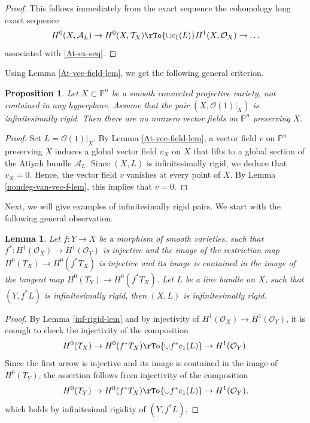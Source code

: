 \documentclass[reqno]{amsart}
\newtheorem{lemma}[theorem]{Lemma}
\newtheorem{prop}[theorem]{Proposition}
\theoremstyle{definition}
\theoremstyle{remark}
\renewcommand{\P}{{\mathbb P}}
\newcommand{\OO}{{\mathcal O}}
\newcommand{\sub}{\subset}
\newcommand{\cA}{\mathcal{A}}
\newcommand{\cT}{\mathcal{T}}
\newcommand{\cO}{\mathcal{O}}
\numberwithin{equation}{section}
\begin{document}
\begin{proof}
This follows immediately from 
the exact sequence the cohomology long exact sequence
$$H^0(X,\cA_L)\to H^0(X,\cT_X)\rTo{\cup c_1(L)} H^1(X,\cO_X)\to\ldots$$
associated with \eqref{At-ex-seq}.
\end{proof}

Using Lemma \ref{At-vec-field-lem}, we get the following general criterion.

\begin{prop}\label{inf-rigid-emb-prop} 
Let $X\sub \P^n$ be a smooth connected projective variety, 
not contained in any hyperplane. 
Assume that the pair $(X,\cO(1)|_X)$ is infinitesimally rigid.
Then there are no nonzero vector fields on $\P^n$ preserving $X$.
\end{prop}

\begin{proof} Set $L=\cO(1)|_X$.
By Lemma \ref{At-vec-field-lem}, a vector field $v$ on $\P^n$ preserving $X$ induces a global vector field $v_X$ on $X$ that lifts to a global section of the Atiyah bundle $\cA_L$.
Since $(X,L)$ is infinitesimally rigid, we deduce that $v_X=0$. Hence, the vector field $v$ vanishes at every point of $X$. By Lemma \ref{nondeg-van-vec-f-lem}, this implies that $v=0$.
\end{proof}

Next, we will give examples of infinitesimally rigid pairs.
We start with the following general observation.

\begin{lemma}\label{inf-rigid-pullback-lem} 
Let $f:Y\to X$ be a morphism of smooth varieties, such that $f^*:H^1(\OO_X)\to H^1(\OO_Y)$ is injective and the image of the restriction map
$H^0(T_X)\to H^0(f^*T_X)$ is injective and its image is contained in the image of the tangent map $H^0(T_Y)\to H^0(f^*T_X)$. Let $L$ be a line bundle on $X$,
such that $(Y,f^*L)$ is infinitesimally rigid, then $(X,L)$ is infinitesimally rigid.
\end{lemma}

\begin{proof} By Lemma \ref{inf-rigid-lem} and by injectivity of $H^1(\OO_X)\to H^1(\OO_Y)$, it is enough to check the injectivity of the composition
$$H^0(T_X)\to H^0(f^*T_X)\rTo{\cup f^*c_1(L)}\to H^1(\OO_Y).$$
Since the first arrow is injective and its image is contained in the image of $H^0(T_Y)$, the assertion follows from 
injectivity of the composition 
$$H^0(T_Y)\to H^0(f^*T_X)\rTo{\cup f^*c_1(L)}\to H^1(\OO_Y),$$
which holds by infinitesimal rigidity of $(Y,f^*L)$.
\end{proof}
\end{document}
